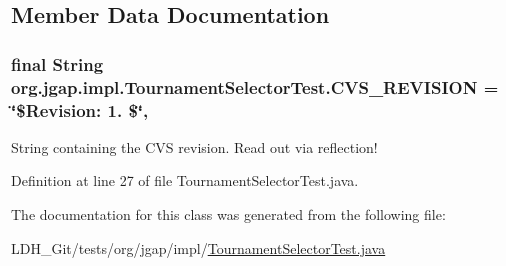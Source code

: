 \subsection{Member Data Documentation}
\hypertarget{classorg_1_1jgap_1_1impl_1_1_tournament_selector_test_acaae2e63afd5cc87e019ce6f02416d76}{
\subsubsection[{C\-V\-S\-\_\-\-R\-E\-V\-I\-S\-I\-O\-N}]{\setlength{\rightskip}{0pt plus 5cm}final String org.\-jgap.\-impl.\-Tournament\-Selector\-Test.\-C\-V\-S\-\_\-\-R\-E\-V\-I\-S\-I\-O\-N = \char`\"{}\$Revision\-: 1. \$\char`\"{}\hspace{0.3cm}{\ttfamily [static]}, {\ttfamily [private]}}}\label{classorg_1_1jgap_1_1impl_1_1_tournament_selector_test_acaae2e63afd5cc87e019ce6f02416d76}
String containing the C\-V\-S revision. Read out via reflection! 

Definition at line 27 of file Tournament\-Selector\-Test.\-java.



The documentation for this class was generated from the following file\-:\begin{DoxyCompactItemize}
\item 
L\-D\-H\-\_\-\-Git/tests/org/jgap/impl/\hyperlink{_tournament_selector_test_8java}{Tournament\-Selector\-Test.\-java}\end{DoxyCompactItemize}
